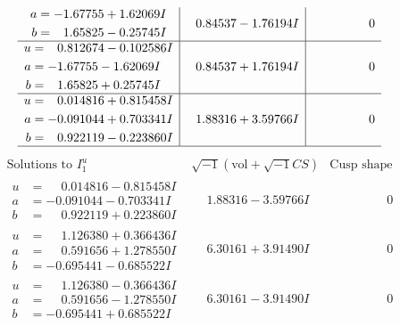 \documentclass[1p]{elsarticle_modified}
\theoremstyle{definition}
\newcommand{\I}{\sqrt{-1}}
\begin{document}
$$\begin{array}{c|c|c}
\begin{aligned}
a &= -1.67755 + 1.62069 I \\
b &= \phantom{-}1.65825 - 0.25745 I\end{aligned}
 & \phantom{-}0.84537 - 1.76194 I & \phantom{-0.000000 } 0 \\ \hline\begin{aligned}
u &= \phantom{-}0.812674 - 0.102586 I \\
a &= -1.67755 - 1.62069 I \\
b &= \phantom{-}1.65825 + 0.25745 I\end{aligned}
 & \phantom{-}0.84537 + 1.76194 I & \phantom{-0.000000 } 0 \\ \hline\begin{aligned}
u &= \phantom{-}0.014816 + 0.815458 I \\
a &= -0.091044 + 0.703341 I \\
b &= \phantom{-}0.922119 - 0.223860 I\end{aligned}
 & \phantom{-}1.88316 + 3.59766 I & \phantom{-0.000000 } 0\\
 \hline 
 \end{array}$$\newpage$$\begin{array}{c|c|c}  
\text{Solutions to }I^u_{1}& \I (\text{vol} + \sqrt{-1}CS) & \text{Cusp shape}\\
 \hline 
\begin{aligned}
u &= \phantom{-}0.014816 - 0.815458 I \\
a &= -0.091044 - 0.703341 I \\
b &= \phantom{-}0.922119 + 0.223860 I\end{aligned}
 & \phantom{-}1.88316 - 3.59766 I & \phantom{-0.000000 } 0 \\ \hline\begin{aligned}
u &= \phantom{-}1.126380 + 0.366436 I \\
a &= \phantom{-}0.591656 + 1.278550 I \\
b &= -0.695441 - 0.685522 I\end{aligned}
 & \phantom{-}6.30161 + 3.91490 I & \phantom{-0.000000 } 0 \\ \hline\begin{aligned}
u &= \phantom{-}1.126380 - 0.366436 I \\
a &= \phantom{-}0.591656 - 1.278550 I \\
b &= -0.695441 + 0.685522 I\end{aligned}
 & \phantom{-}6.30161 - 3.91490 I & \phantom{-0.000000 } 0 \\ \hline\begin{aligned}

\end{aligned}
\end{array}$$
\end{document}
